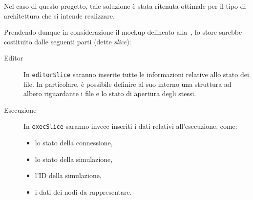 




    
      Nel caso di questo progetto, tale soluzione è stata ritenuta ottimale per il tipo di architettura che si intende realizzare.

      Prendendo dunque in considerazione il mockup delineato alla~, lo store sarebbe costituito dalle seguenti parti (dette \emph{slice}):

      \begin{description}
        \item[Editor]
          In \texttt{editorSlice} saranno inserite tutte le informazioni relative allo stato dei file.
          In particolare, è possibile definire al suo interno una struttura ad albero riguardante i file e lo stato di apertura degli stessi.
        \item[Esecuzione]
          In \texttt{execSlice} saranno invece inseriti i dati relativi all'esecuzione, come:
          \begin{itemize}
            \item lo stato della connessione,
            \item lo stato della simulazione,
            \item l'ID della simulazione,
            \item i dati dei nodi da rappresentare.
          \end{itemize}
      \end{description}



